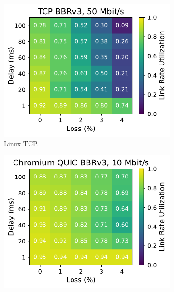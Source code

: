 \begin{figure}[ht]
\begin{subfigure}[b]{0.22\linewidth}
        \includegraphics[width=\linewidth,trim={0 0 2cm 0},clip]{splitting/figures/heatmaps/heatmap_tcp_bbr3_50mbps.pdf}
        \caption{Linux TCP.}
    \end{subfigure}
    \begin{subfigure}[b]{0.22\linewidth}
        \includegraphics[width=\linewidth,trim={0 0 2cm 0},clip]{splitting/figures/heatmaps/heatmap_quic_bbr3_10mbps.pdf}

\end{subfigure}
\end{figure}
